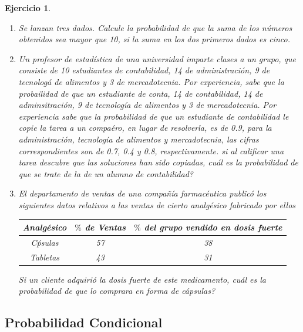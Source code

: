 \documentclass[12pt,twoside]{article}
\newtheorem{Ejer}{Ejercicio}
\begin{document}
\begin{Ejer}
\begin{enumerate}
\item Se lanzan tres dados. Calcule la probabilidad de que la suma de los n\'umeros obtenidos sea mayor que 10, si la suma en los dos primeros dados es cinco.

\item Un profesor de estad\'istica de una universidad imparte clases a un grupo, que consiste de 10 estudiantes de contabilidad, 14 de administraci\'on, 9 de tecnolog\'a de alimentos y 3 de mercadotecnia. Por experiencia, sabe que la probailidad de que un estudiante de conta, 14 de contabilidad, 14 de adminsitraci\'on, 9 de tecnolog\'ia de alimentos y 3 de mercadotecnia. Por experiencia sabe que la probabilidad de que un estudiante de contabilidad le copie la tarea a un compa\'ero, en lugar de resolverla, es de 0.9, para la administraci\'on, tecnolog\'ia de alimentos y mercadotecnia, las cifras correspondientes son de 0.7, 0.4 y 0.8, respectivamente. si al calificar una tarea descubre que las soluciones han sido copiadas,  cu\'al es la probabilidad de que se trate de la de un alumno de contabilidad?

\item El departamento de ventas de una compa\~n\'ia farmac\'eutica public\'o los siguientes datos relativos a las ventas de cierto analg\'esico fabricado por ellos
\begin{table}[!ht]
\begin{center}
\begin{tabular}{|c|c|c|}
\hline
 Analg\'esico & $\%$ de Ventas & $\%$ del grupo vendido en dosis fuerte \\\hline
C\'psulas & 57 & 38 \\\hline
Tabletas & 43 & 31 \\\hline
\end{tabular}
\end{center}
\end{table}
Si un cliente adquiri\'o la dosis fuerte de este medicamento,  cu\'al es la probabilidad de que lo comprara en forma de c\'apsulas?

\end{enumerate}
\end{Ejer}


\subsection{Probabilidad Condicional}
\end{document}
